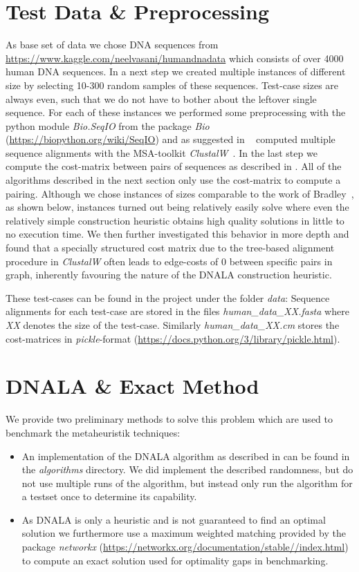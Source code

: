 \documentclass[12pt]{article}
\begin{document}
\section{Test Data \& Preprocessing}
As base set of data we chose DNA sequences from \url{https://www.kaggle.com/neelvasani/humandnadata} which consists of over 4000 human DNA sequences.
In a next step we created multiple instances of different size by selecting 10-300 random samples of these sequences.
Test-case sizes are always even, such that we do not have to bother about the leftover single sequence.
For each of these instances we performed some preprocessing with the python module \textit{Bio.SeqIO} from the package \textit{Bio} (\url{https://biopython.org/wiki/SeqIO}) and as suggested in ~\cite{mainpaper} computed  multiple sequence alignments with the MSA-toolkit \emph{ClustalW}~\cite{clustalw}. In the last step we compute the cost-matrix between pairs of sequences as described in \cite{mainpaper}.
All of the algorithms described in the next section only use the cost-matrix to compute a pairing.
Although we chose instances of sizes comparable to the work of Bradley~\cite{mainpaper}, as shown below, instances turned out being relatively easily solve where even the relatively simple construction heuristic obtains high quality solutions in little to no execution time. We then further investigated this behavior in more depth and found that a specially structured cost matrix due to the tree-based alignment procedure in \emph{ClustalW} often leads to edge-costs of $0$ between specific pairs in graph, inherently favouring the nature of the DNALA construction heuristic. 

These test-cases can be found in the project under the folder \textit{data}:
Sequence alignments for each test-case are stored in the files \textit{human\_data\_XX.fasta} where \textit{XX} denotes the size of the test-case.
Similarly \textit{human\_data\_XX.cm} stores the cost-matrices in \textit{pickle}-format (\url{https://docs.python.org/3/library/pickle.html}).

\section{DNALA \& Exact Method}
We provide two preliminary methods to solve this problem which are used to benchmark the metaheuristik techniques:
\begin{itemize}
    \item An implementation of the DNALA algorithm as described in \cite{mainpaper} can be found in the \textit{algorithms} directory.
    We did implement the described randomness, but do not use multiple runs of the algorithm, but instead only run the algorithm for a testset once to determine its capability.

    \item As DNALA is only a heuristic and is not guaranteed to find an optimal solution we furthermore use a maximum weighted matching provided by the package \textit{networkx} (\url{https://networkx.org/documentation/stable//index.html}) to compute an exact solution used for optimality gaps in benchmarking.
\end{itemize}
\end{document}
